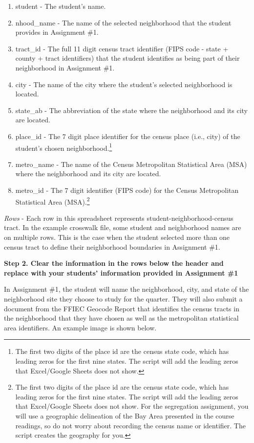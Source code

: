 \documentclass[
]{book}
\providecommand{\tightlist}{%
  \setlength{\itemsep}{0pt}\setlength{\parskip}{0pt}}
\begin{document}
\begin{enumerate}
\def\labelenumi{\arabic{enumi}.}
\tightlist
\item
  student - The student's name.
\item
  nhood\_name - The name of the selected neighborhood that the student provides in Assignment \#1.
\item
  tract\_id - The full 11 digit census tract identifier (FIPS code - state + county + tract identifiers) that the student identifies as being part of their neighborhood in Assignment \#1.
\item
  city - The name of the city where the student's selected neighborhood is located.
\item
  state\_ab - The abbreviation of the state where the neighborhood and its city are located.
\item
  place\_id - The 7 digit place identifier for the census place (i.e., city) of the student's chosen neighborhood.\footnote{The first two digits of the place id are the census state code, which has leading zeros for the first nine states. The script will add the leading zeros that Excel/Google Sheets does not show.}
\item
  metro\_name - The name of the Census Metropolitan Statistical Area (MSA) where the neighborhood and its city are located.
\item
  metro\_id - The 7 digit identifier (FIPS code) for the Census Metropolitan Statistical Area (MSA).\footnote{The first two digits of the place id are the census state code, which has leading zeros for the first nine states. The script will add the leading zeros that Excel/Google Sheets does not show. For the segregation assignment, you will use a geographic delineation of the Bay Area presented in the course readings, so do not worry about recording the census name or identifier. The script creates the geography for you.}
\end{enumerate}

\emph{Rows} - Each row in this spreadsheet represents student-neighborhood-census tract. In the example crosswalk file, some student and neighborhood names are on multiple rows. This is the case when the student selected more than one census tract to define their neighborhood boundaries in Assignment \#1.

\textbf{Step 2. Clear the information in the rows below the header and replace with your students' information provided in Assignment \#1}

In Assignment \#1, the student will name the neighborhood, city, and state of the neighborhood site they choose to study for the quarter. They will also submit a document from the FFIEC Geocode Report that identifies the census tracts in the neighborhood that they have chosen as well as the metropolitan statistical area identifiers. An example image is shown below.
\end{document}
